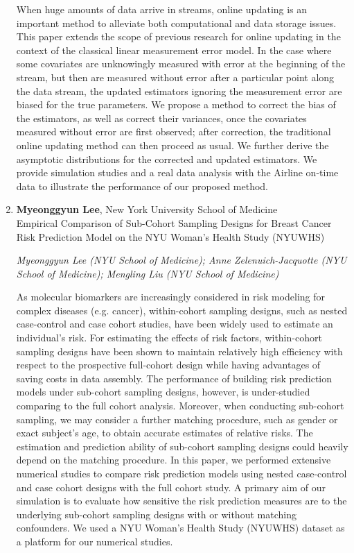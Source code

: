 \begin{enumerate}
When huge amounts of data arrive in streams, online updating is an important method to alleviate both computational and data storage issues. This paper extends the scope of previous research for online updating in the context of the classical linear measurement error model. In the case where some covariates are unknowingly measured with error at the beginning of the stream, but then are measured without error after a particular point along the data stream, the updated estimators ignoring the measurement error are biased for the true parameters. We propose a method to correct the bias of the estimators, as well as correct their variances, once the covariates measured without error are first observed; after correction, the traditional online updating method can then proceed as usual. We further derive the asymptotic distributions for the corrected and updated estimators. We provide simulation studies and a real data analysis with the Airline on-time data to illustrate the performance of our proposed method.

\item \textbf{Myeonggyun Lee}, New York University School of Medicine \\
Empirical Comparison of Sub-Cohort Sampling Designs for Breast Cancer Risk Prediction Model on the NYU Woman’s Health Study (NYUWHS)

\emph{\footnotesize Myeonggyun Lee (NYU School of Medicine); Anne Zelenuich-Jacquotte (NYU School of Medicine); Mengling Liu (NYU School of Medicine)}

As molecular biomarkers are increasingly considered in risk modeling for complex diseases (e.g. cancer), within-cohort sampling designs, such as nested case-control and case cohort studies, have been widely used to estimate an individual’s risk. For estimating the effects of risk factors, within-cohort sampling designs have been shown to maintain relatively high efficiency with respect to the prospective full-cohort design while having advantages of saving costs in data assembly. The performance of building risk prediction models under sub-cohort sampling designs, however, is under-studied comparing to the full cohort analysis. Moreover, when conducting sub-cohort sampling, we may consider a further matching procedure, such as gender or exact subject’s age, to obtain accurate estimates of relative risks. The estimation and prediction ability of sub-cohort sampling designs could heavily depend on the matching procedure. In this paper, we performed extensive numerical studies to compare risk prediction models using nested case-control and case cohort designs with the full cohort study. A primary aim of our simulation is to evaluate how sensitive the risk prediction measures are to the underlying sub-cohort sampling designs with or without matching confounders. We used a NYU Woman’s Health Study (NYUWHS) dataset as a platform for our numerical studies.


\end{enumerate}
